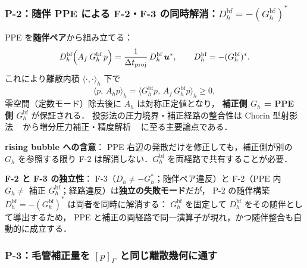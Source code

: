\subsubsection{\texorpdfstring{P-2：随伴 PPE による F-2・F-3 の同時解消：$D_h^\text{bf} = -(G_h^\text{bf})^\ast$}{P-2：随伴 PPE による F-2・F-3 の同時解消}}
\label{sec:bf_p2_adjoint}

PPE を\textbf{随伴ペア}から組み立てる：
\begin{equation}
  D_h^\text{bf}\Bigl(A_f\,G_h^\text{bf}\,p\Bigr)
    = \frac{1}{\Delta t_{\mathrm{proj}}}\,D_h^\text{bf}\,\bm{u}^*,
  \qquad D_h^\text{bf} = -(G_h^\text{bf})^\ast.
  \label{eq:bf_p2_ppe}
\end{equation}
これにより離散内積 $\langle\cdot,\cdot\rangle_h$ 下で
\begin{equation}
  \langle p,\,A_h p\rangle_h
    = \langle G_h^\text{bf} p,\,A_f\,G_h^\text{bf} p\rangle_h
    \ge 0,
  \label{eq:bf_p2_spd}
\end{equation}
零空間（定数モード）除去後に $A_h$ は対称正定値となり，
\textbf{補正側 $G_h$ = PPE 側 $G_h^\text{bf}$} が保証される．
投影法の圧力境界・補正経路の整合性は Chorin 型射影法
~\cite{Chorin1968} から増分圧力補正・精度解析
~\cite{vanKan1986,BrownCortezMinion2001,Guermond2006} に至る主要論点である．

\noindent\textbf{rising bubble への含意}：
PPE 右辺の発散だけを修正しても，補正側が別の $G_h$ を参照する限り
F-2 は解消しない．$G_h^\text{bf}$ を両経路で共有することが必要．

\noindent\textbf{F-2 と F-3 の独立性}：
F-3（$D_h\neq -G_h^\ast$；随伴ペア違反）と
F-2（PPE 内 $G_h\neq$ 補正 $G_h^\text{bf}$；経路違反）は\textbf{独立の失敗モード}だが，
P-2 の随伴構築 $D_h^\text{bf}=-(G_h^\text{bf})^\ast$ は両者を同時に解消する：
$G_h^\text{bf}$ を固定して $D_h^\text{bf}$ をその随伴として導出するため，
PPE と補正の両経路で同一演算子が現れ，かつ随伴整合も自動的に成立する．

\subsubsection{\texorpdfstring{P-3：毛管補正量を $[p]_\Gamma$ と同じ離散幾何に通す}{P-3：毛管補正量を圧力ジャンプと同じ離散幾何に通す}}
\label{sec:bf_p3_geometry}

